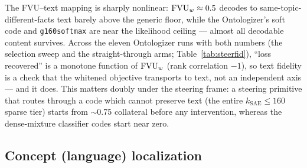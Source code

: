 The FVU--text mapping is sharply nonlinear: $\mathrm{FVU}_w \approx 0.5$ decodes to
same-topic-different-facts text barely above the generic floor, while the
Ontologizer's soft code and \texttt{g160softmax} are near the likelihood
ceiling --- almost all decodable content survives. Across the eleven
Ontologizer runs with both numbers (the selection sweep and the
straight-through arms; Table~\ref{tab:steerfid}), ``loss recovered'' is a
monotone function of $\mathrm{FVU}_w$ (rank correlation $-1$), so text
fidelity is a check that the whitened objective transports to text, not
an independent axis --- and it does. This matters doubly under the
steering frame: a steering primitive that routes through a code which
cannot preserve text (the entire $k_{\mathrm{SAE}}{\leq}160$ sparse tier) starts from
$\sim$0.75 collateral before any intervention, whereas the dense-mixture
classifier codes start near zero.

\subsection{Concept (language) localization}
\label{sec:langlocal}

